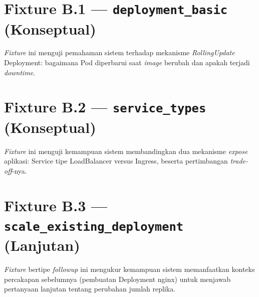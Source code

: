 \section{Fixture B.1 — \texttt{deployment\_basic} (Konseptual)}

\textit{Fixture} ini menguji pemahaman sistem terhadap mekanisme \textit{RollingUpdate} Deployment: bagaimana Pod diperbarui saat \textit{image} berubah dan apakah terjadi \textit{downtime}.



\section{Fixture B.2 — \texttt{service\_types} (Konseptual)}

\textit{Fixture} ini menguji kemampuan sistem membandingkan dua mekanisme \textit{expose} aplikasi: Service tipe LoadBalancer versus Ingress, beserta pertimbangan \textit{trade-off}-nya.



\section{Fixture B.3 — \texttt{scale\_existing\_deployment} (Lanjutan)}

\textit{Fixture} bertipe \textit{followup} ini mengukur kemampuan sistem memanfaatkan konteks percakapan sebelumnya (pembuatan Deployment nginx) untuk menjawab pertanyaan lanjutan tentang perubahan jumlah replika.

